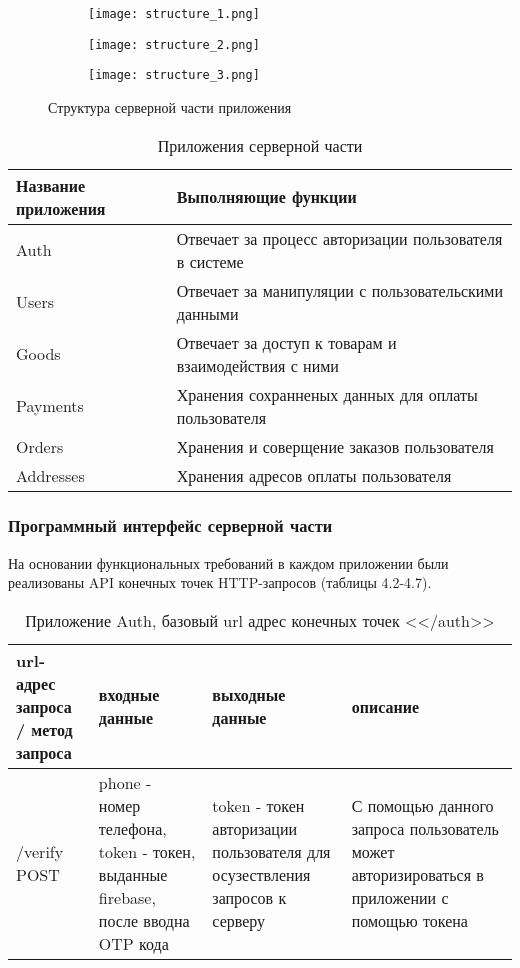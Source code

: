 \begin{figure}[h!]
    \begin{subfigure}[b]{0.3\textwidth}
    \centering
    \texttt{[image: structure\_1.png]}
    \caption{}
    \end{subfigure}
    \begin{subfigure}[b]{0.3\textwidth}
    \centering
    \texttt{[image: structure\_2.png]}
    \caption{}
    \end{subfigure}
    \begin{subfigure}[b]{0.3\textwidth}
    \centering
    \texttt{[image: structure\_3.png]}
    \caption{}
    \end{subfigure}
    \caption{ Структура серверной части приложения }
    \label{back:struct}
\end{figure}

\begin{table}
    \caption{Приложения серверной части}
    \begin{tabular}{ | l | p{6cm} | }
        \hline
        Название приложения & Выполняющие функции \\ \hline
        Auth & Отвечает за процесс авторизации пользователя в системе \\ \hline
        Users & Отвечает за манипуляции с пользовательскими данными \\ \hline
        Goods & Отвечает за доступ к товарам и взаимодействия с ними \\ \hline
        Payments & Хранения сохранненых данных для оплаты пользователя\\ \hline
        Orders & Хранения и соверщение заказов пользователя \\ \hline
        Addresses & Хранения адресов оплаты пользователя \\ \hline
    \end{tabular}
\end{table}


\subsubsection{Программный интерфейс серверной части}\hfill

На основании функциональных требований в каждом приложении были реализованы API конечных точек HTTP-запросов (таблицы 4.2-4.7).

\begin{table}
    \caption{Приложение Auth, базовый url адрес конечных точек <</auth>>}
    \begin{tabular}{ | p{3cm} | p{4cm} | p{3cm} | p{3cm} | }
        \hline
        url-адрес запроса / метод запроса & входные данные & выходные данные  & описание \\ \hline
    /verify POST  & phone - номер телефона, token - токен, выданные firebase, после вводна OTP кода & token - токен авторизации пользователя для осузествления запросов к серверу & С помощью данного запроса пользователь может авторизироваться в приложении с помощью токена \\ \hline
    \end{tabular}
\end{table}


